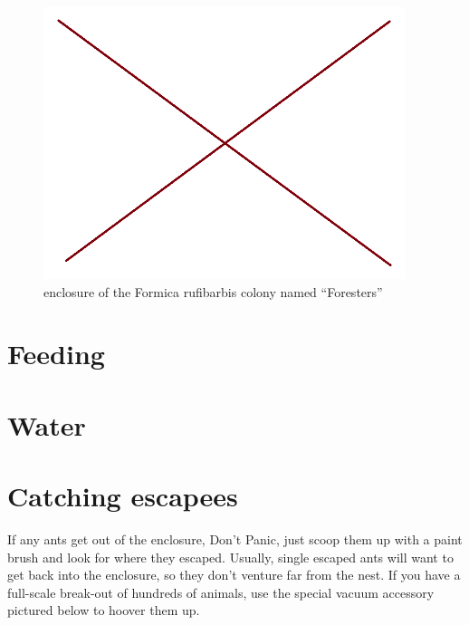 \begin{figure}[H]
  \centering
  \includegraphics[scale=0.5]{resources/F-rufibarbis.png}
  \caption[L. niger 1]{enclosure of the Formica rufibarbis colony named ``Foresters''}
\end{figure}


\section{Feeding}
\section{Water}
\section{Catching escapees}
If any ants get out of the enclosure, Don't Panic, just scoop them up with a paint brush and look for where they escaped.
Usually, single escaped ants will want to get back into the enclosure, so they don't venture far from the nest.
If you have a full-scale break-out of hundreds of animals, use the special vacuum accessory pictured below to hoover them up.
